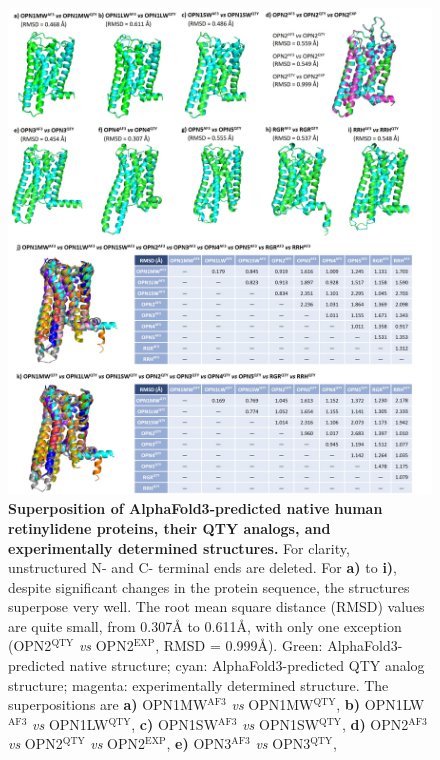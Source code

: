 \documentclass[fleqn, 10pt]{manuscript}
\begin{document}
\begin{figure}[htbp]
	\centering
	\includegraphics[width=\linewidth]{Figures/superposition-human-pairwise.jpg}
	\caption{\textbf{Superposition of AlphaFold3-predicted native human retinylidene proteins, their QTY analogs, and experimentally determined structures. } For clarity, unstructured N- and C- terminal ends are deleted. 
    For \textbf{a)} to \textbf{i)}, despite significant changes in the protein sequence, the structures superpose very well. The root mean square distance (RMSD) values are quite small, from 0.307{\AA} to 0.611\AA, with only one exception (OPN2$^{\textrm{QTY}}$ \textit{vs} OPN2$^{\textrm{EXP}}$, RMSD = 0.999\AA). Green: AlphaFold3-predicted native structure; cyan: AlphaFold3-predicted QTY analog structure; magenta: experimentally determined structure. The superpositions are 
    \textbf{a)} OPN1MW$^{\textrm{AF3}}$ \textit{vs} OPN1MW$^{\textrm{QTY}}$, 
    \textbf{b)} OPN1LW$^{\textrm{AF3}}$ \textit{vs} OPN1LW$^{\textrm{QTY}}$, 
    \textbf{c)} OPN1SW$^{\textrm{AF3}}$ \textit{vs} OPN1SW$^{\textrm{QTY}}$, 
    \textbf{d)} OPN2$^{\textrm{AF3}}$ \textit{vs} OPN2$^{\textrm{QTY}}$ \textit{vs} OPN2$^{\textrm{EXP}}$, 
    \textbf{e)} OPN3$^{\textrm{AF3}}$ \textit{vs} OPN3$^{\textrm{QTY}}$, 
}
\end{figure}
\end{document}
